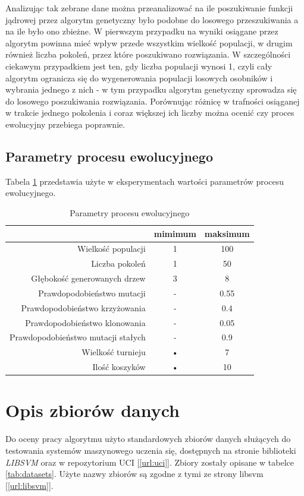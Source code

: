 	Analizując tak zebrane dane można przeanalizować na ile poszukiwanie funkcji jądrowej przez algorytm genetyczny było podobne do losowego przeszukiwania a na ile było ono zbieżne. W pierwszym przypadku na wyniki osiągane przez algorytm powinna mieć wpływ przede wszystkim wielkość populacji, w drugim również liczba pokoleń, przez które poszukiwano rozwiązania. W szczególności ciekawym przypadkiem jest ten, gdy liczba populacji wynosi 1, czyli cały algorytm ogranicza się do wygenerowania populacji losowych osobników i wybrania jednego z nich - w tym przypadku algorytm genetyczny sprowadza się do losowego poszukiwania rozwiązania. Porównując różnicę w trafności osiąganej w trakcie jednego pokolenia i coraz większej ich liczby można ocenić czy proces ewolucyjny przebiega poprawnie.
	
\subsection{Parametry procesu ewolucyjnego}
Tabela \ref{tab:params-gp} przedstawia użyte w eksperymentach wartości parametrów procesu ewolucyjnego.
\begin{table}
	\caption{Parametry procesu ewolucyjnego \label{tab:params-gp}}
	\begin{tabular}{|r||c|c|}
	\hline
	 & mimimum & maksimum \\ 
	\hline \hline 
	Wielkość populacji & 1 & 100 \\ 
	\hline
	Liczba pokoleń & 1 & 50 \\ 
	\hline 
	Głębokość generowanych drzew & 3 & 8 \\ 
	\hline 
	Prawdopodobieństwo mutacji & - & 0.55 \\ 
	\hline 
	Prawdopodobieństwo krzyżowania & - & 0.4 \\ 
	\hline 
	Prawdopodobieństwo klonowania & - & 0.05 \\ 
	\hline 
	Prawdopodobieństwo mutacji stałych & - & 0.9 \\ 
	\hline 
	Wielkość turnieju & • & 7 \\ 
	\hline 
	Ilość koszyków  & • & 10 \\ 
	\hline 
	\end{tabular} 
\end{table}
	
\section{Opis zbiorów danych}
	Do oceny pracy algorytmu użyto standardowych zbiorów danych służących do testowania systemów maszynowego uczenia się, dostępnych na stronie biblioteki \emph{LIBSVM} \cite{chang_libsvm:_2011}  oraz w repozytorium UCI \cite{Bache+Lichman:2013} [\ref{url:uci}]. Zbiory zostały opisane w tabelce \ref{tab:datasets}. Użyte nazwy zbiorów są zgodne z tymi ze strony libsvm [\ref{url:libsvm}].

